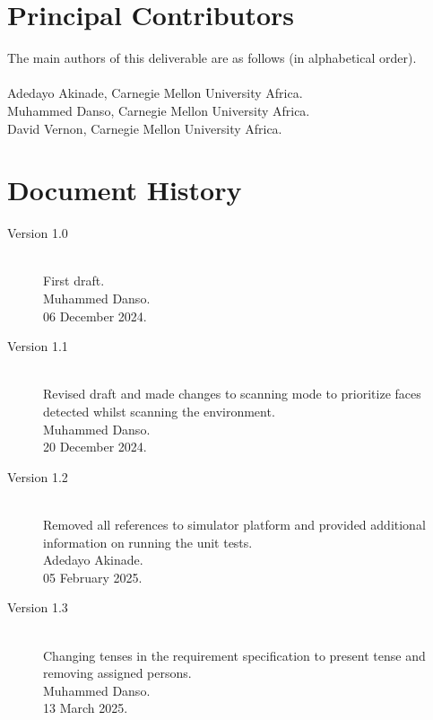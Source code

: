 \documentclass{CSSRforAfrica}
\newcommand{\blank}{~\\}
\begin{document}
\newpage
 
 

                       

\pagebreak
\section*{Principal Contributors}
\label{contributors}
The main authors of this deliverable are as follows (in alphabetical order).
\blank
~
\blank
Adedayo Akinade, Carnegie Mellon University Africa.\\              
Muhammed Danso, Carnegie Mellon University Africa.\\                 
David Vernon, Carnegie Mellon University Africa.\\       



\pagebreak
\section*{Document History}
\label{revision_history}

\begin{description}
\item[Version 1.0]~\\                        %
First draft.\\
Muhammed Danso.\\
06 December 2024.
\end{description}

\begin{description}
	\item[Version 1.1]~\\                        %
	Revised draft and made changes to scanning mode to prioritize faces detected whilst scanning the environment.\\
	Muhammed Danso.\\
	20 December 2024.
\end{description}

\begin{description}
	\item[Version 1.2]~\\                        %
	Removed all references to simulator platform and provided additional information on running the unit tests. \\
	Adedayo Akinade.\\
	05 February 2025.
\end{description}

\begin{description}
	\item[Version 1.3]~\\                        %
	Changing tenses in the requirement specification to present tense and removing assigned persons. \\
	Muhammed Danso.\\
	13 March 2025.
\end{description}
\blank
~
\blank
\end{document}

